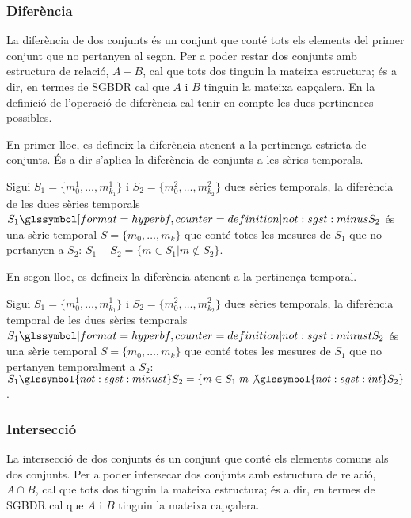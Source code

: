 \subsubsection{Diferència}

La diferència de dos conjunts és un conjunt que conté tots els
elements del primer conjunt que no pertanyen al segon.  Per a poder
restar dos conjunts amb estructura de relació, $A - B$, cal que tots
dos tinguin la mateixa estructura; és a dir, en termes de \gls{SGBDR}
cal que $A$ i $B$ tinguin la mateixa capçalera.
En la definició de l'operació de diferència cal tenir en compte les
dues pertinences possibles.

En primer lloc, es defineix la diferència atenent a la pertinença
estricta de conjunts. És a dir s'aplica la diferència de
conjunts a les sèries temporals.
\begin{definition}[diferència]
  Sigui $S_1=\{m_0^1, \dotsc, m_{k_1}^1\}$ i $S_2=\{m_0^2, \dotsc,
  m_{k_2}^2\}$ dues sèries temporals, la diferència de les dues sèries
  temporals $S_1 \glssymboldef{not:sgst:minus} S_2$ és una sèrie
  temporal $S=\{m_0, \dotsc, m_k\}$ que conté totes les mesures de
  $S_1$ que no pertanyen a $S_2$: $S_1 - S_2 = \{ m \in S_1 | m \notin
  S_2 \}$.
\end{definition}

En segon lloc, es defineix la diferència atenent a la pertinença
temporal.
\begin{definition}
  Sigui $S_1=\{m_0^1, \dotsc, m_{k_1}^1\}$ i $S_2=\{m_0^2, \dotsc,
  m_{k_2}^2\}$ dues sèries temporals, la diferència temporal de les
  dues sèries temporals $S_1 \glssymboldef{not:sgst:minust} S_2$ és
  una sèrie temporal $S=\{m_0, \dotsc, m_k\}$ que conté totes les
  mesures de $S_1$ que no pertanyen temporalment a $S_2$: $S_1
  \glssymbol{not:sgst:minust} S_2 = \{ m \in S_1 | m
  \not\glssymbol{not:sgst:int} S_2 \}$.
\end{definition}




\subsubsection{Intersecció}

La intersecció de dos conjunts és un conjunt que conté els elements
comuns als dos conjunts.  Per a poder intersecar dos conjunts amb estructura
de relació, $A \cap B$, cal que tots dos tinguin la mateixa
estructura; és a dir, en termes de \gls{SGBDR} cal que $A$ i $B$ tinguin la
mateixa capçalera.

